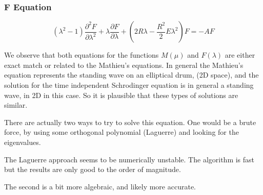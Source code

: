 \subsubsection{ F Equation }

\begin{equation}\label{eqLG3}
(\lambda^2-1)\frac{\partial^2 F}{\partial \lambda^2} + \lambda\frac{\partial F}{\partial \lambda} + \left(2R\lambda -  \frac{R^2}{2} E\lambda^2\right) F = -AF
\end{equation}

We observe that both equations for the functions $ M(\mu) $ and $ F(\lambda) $ are either exact match or related to the Mathieu's equations. In general the Mathieu's equation represents the standing wave on an elliptical drum, (2D space), and the solution for the time independent Schrodinger equation is in general a standing wave, in 2D in this case. So it is plausible that these types of solutions are similar.

There are actually two ways to try to solve this equation. One would be a brute force, by using some orthogonal polynomial (Laguerre) and looking for the eigenvalues.

The Laguerre approach seems to be numerically unstable. The algorithm is fast but the results are only good to the order of magnitude. 

The second is a bit more algebraic, and likely more accurate.

